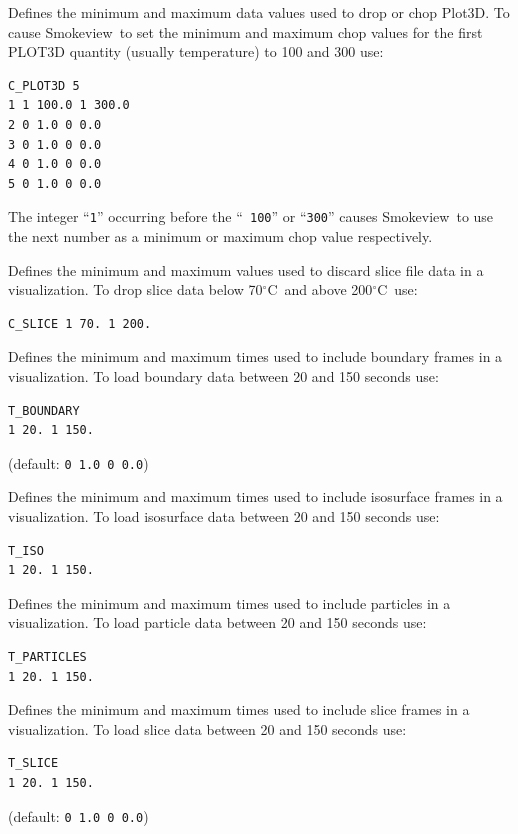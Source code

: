 \documentclass[11pt,twoside]{book}
\newcommand{\degC}{$^\circ$C}
\newcommand{\smokeview}{{Smokeview}}
\newcommand{\hitem}[1]{\item[{\bf #1} \hfill]}
\begin{document}
\hitem{C\_PLOT3D} Defines the minimum and maximum data values used
to drop or chop Plot3D.  To cause \smokeview\ to set the minimum
and maximum chop values for the first PLOT3D quantity (usually
temperature) to 100 and 300 use:

\begin{verbatim}
C_PLOT3D 5
1 1 100.0 1 300.0
2 0 1.0 0 0.0
3 0 1.0 0 0.0
4 0 1.0 0 0.0
5 0 1.0 0 0.0
\end{verbatim}

\noindent The integer ``{\tt 1}'' occurring before the ``{\tt
100}'' or ``{\tt 300}'' causes \smokeview\ to use the next number
as a minimum or maximum chop value respectively.

\hitem{C\_SLICE} Defines the minimum and maximum values used to
discard slice file data in a visualization. To drop slice data
below 70\degC\ and above 200\degC\ use:

\begin{verbatim}
C_SLICE 1 70. 1 200.
\end{verbatim}

\hitem{T\_BOUNDARY}Defines the minimum and maximum times
used to include boundary frames in a visualization. To load
boundary data between 20 and 150 seconds use:
\begin{verbatim}
T_BOUNDARY
1 20. 1 150.
\end{verbatim}

(default: {\tt 0 1.0 0 0.0})

\hitem{T\_ISO} Defines the minimum and maximum times used
to include isosurface frames in a visualization.  To load
isosurface data between 20 and 150 seconds use:

\begin{verbatim}
T_ISO
1 20. 1 150.
\end{verbatim}


\hitem{T\_PARTICLES}Defines the minimum and maximum
times used to include particles in a visualization.
To load particle data between 20 and 150 seconds use:
\begin{verbatim}
T_PARTICLES
1 20. 1 150.
\end{verbatim}

\hitem{T\_SLICE}Defines the minimum and maximum times used
to include slice frames in a visualization. To load slice
data between 20 and 150 seconds use:
\begin{verbatim}
T_SLICE
1 20. 1 150.
\end{verbatim}

(default: {\tt 0 1.0 0 0.0})
\end{document}
